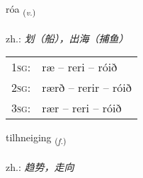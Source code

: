 \documentclass[frontgrid, backgrid]{flacards}\usepackage[]{graphicx}\usepackage[]{xcolor}
\begin{document}
\renewcommand{\flhead}{\vskip5pt \fboxsep=0pt {\small\bfseries\footnotesize Sagnorð | 动词}}
\renewcommand{\fcfoot}{\vskip5pt \fboxsep=0pt \hspace{2pt}{\small\bfseries\footnotesize 3K}}

\renewcommand{\blhead}{\vskip5pt {\small\bfseries\footnotesize Sagnorð | 动词 }}
\renewcommand{\bcfoot}{\vskip5pt \hspace{2pt}{\small\bfseries\footnotesize 3K}}


{róa \small{\textsubscript{(\textit{v.})}} \\[1ex] %
\textphonetic{[rouːa]} \\
zh.: \emph{划（船），出海（捕鱼）} \\  [2ex]
\renewcommand*{\arraystretch}{0.8}
\begin{tabular}{p{1cm}l}
\textsc{1sg}: & ræ -- reri -- róið \\ 
\textsc{2sg}: & rærð -- rerir -- róið \\ 
\textsc{3sg}: & rær -- reri -- róið \\ 
\end{tabular}
}

\renewcommand{\flhead}{\vskip5pt \fboxsep=0pt {\small\bfseries\footnotesize Nafnorð | 名词}}
\renewcommand{\fcfoot}{\vskip5pt \fboxsep=0pt \hspace{2pt}{\small\bfseries\footnotesize 3K}}

\renewcommand{\blhead}{\vskip5pt {\small\bfseries\footnotesize Nafnorð | 名词 }}
\renewcommand{\bcfoot}{\vskip5pt \hspace{2pt}{\small\bfseries\footnotesize 3K}}


{tilhneiging \small{\textsubscript{(\textit{f.})}} \\[1ex] %
 \\
zh.: \emph{趋势，走向} \\  [2ex]
\renewcommand*{\arraystretch}{0.8}
}
\end{document}
